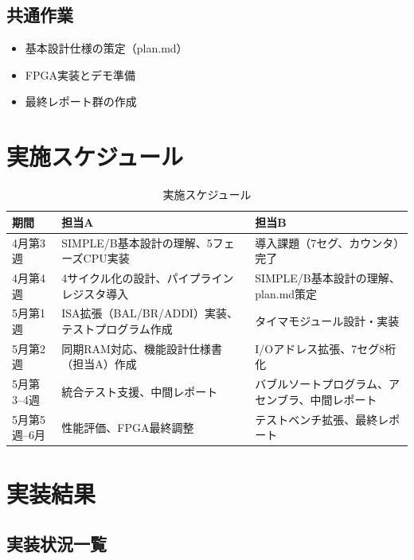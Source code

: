 \documentclass[a4paper,11pt]{ltjsarticle}
\begin{document}
\subsection{共通作業}

\begin{itemize}
\item 基本設計仕様の策定（plan.md）
\item FPGA実装とデモ準備
\item 最終レポート群の作成
\end{itemize}


\section{実施スケジュール}

\begin{table}[h]
\centering
\caption{実施スケジュール}
\begin{tabular}{lp{5.5cm}p{5.5cm}}
\toprule
期間 & 担当A & 担当B \\
\midrule
4月第3週 &
  SIMPLE/B基本設計の理解、5フェーズCPU実装 &
  導入課題（7セグ、カウンタ）完了 \\
\midrule
4月第4週 &
  4サイクル化の設計、パイプラインレジスタ導入 &
  SIMPLE/B基本設計の理解、plan.md策定 \\
\midrule
5月第1週 &
  ISA拡張（BAL/BR/ADDI）実装、テストプログラム作成 &
  タイマモジュール設計・実装 \\
\midrule
5月第2週 &
  同期RAM対応、機能設計仕様書（担当A）作成 &
  I/Oアドレス拡張、7セグ8桁化 \\
\midrule
5月第3--4週 &
  統合テスト支援、中間レポート &
  バブルソートプログラム、アセンブラ、中間レポート \\
\midrule
5月第5週--6月 &
  性能評価、FPGA最終調整 &
  テストベンチ拡張、最終レポート \\
\bottomrule
\end{tabular}
\end{table}


\section{実装結果}

\subsection{実装状況一覧}
\end{document}
